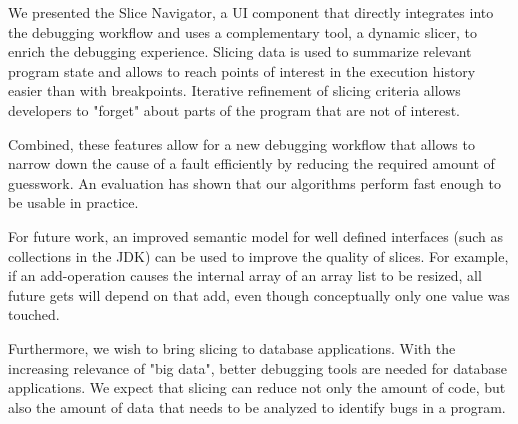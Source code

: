 ﻿\documentclass[
      english,
			conference,
      ]{IEEEtran}
\begin{document}
We presented the Slice Navigator, a UI component that directly integrates into the debugging workflow and uses a complementary tool, a dynamic slicer, to enrich the debugging experience.
Slicing data is used to summarize relevant program state and allows to reach points of interest in the execution history easier than with breakpoints.
Iterative refinement of slicing criteria allows developers to "forget" about parts of the program that are not of interest.

Combined, these features allow for a new debugging workflow that allows to narrow down the cause of a fault efficiently by reducing the required amount of guesswork.
An evaluation has shown that our algorithms perform fast enough to be usable in practice.

For future work, an improved semantic model for well defined interfaces (such as collections in the JDK) can be used to improve the quality of slices. 
For example, if an add-operation causes the internal array of an array list to be resized, all future gets will depend on that add, even though conceptually only one value was touched.

Furthermore, we wish to bring slicing to database applications.
With the increasing relevance of "big data", better debugging tools are needed for database applications.
We expect that slicing can reduce not only the amount of code, but also the amount of data that needs to be analyzed to identify bugs in a program.




\end{document}
